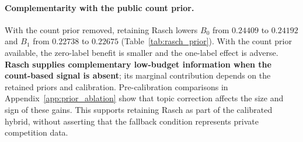 \paragraph{Complementarity with the public count prior.} With the count prior removed, retaining Rasch lowers $B_0$ from $0.24409$ to $0.24192$ and $B_1$ from $0.22738$ to $0.22675$ (Table~\ref{tab:rasch_prior}). With the count prior available, the zero-label benefit is smaller and the one-label effect is adverse. \textbf{Rasch supplies complementary low-budget information when the count-based signal is absent}; its marginal contribution depends on the retained priors and calibration. Pre-calibration comparisons in Appendix~\ref{app:prior_ablation} show that topic correction affects the size and sign of these gains. This supports retaining Rasch as part of the calibrated hybrid, without asserting that the fallback condition represents private competition data.
